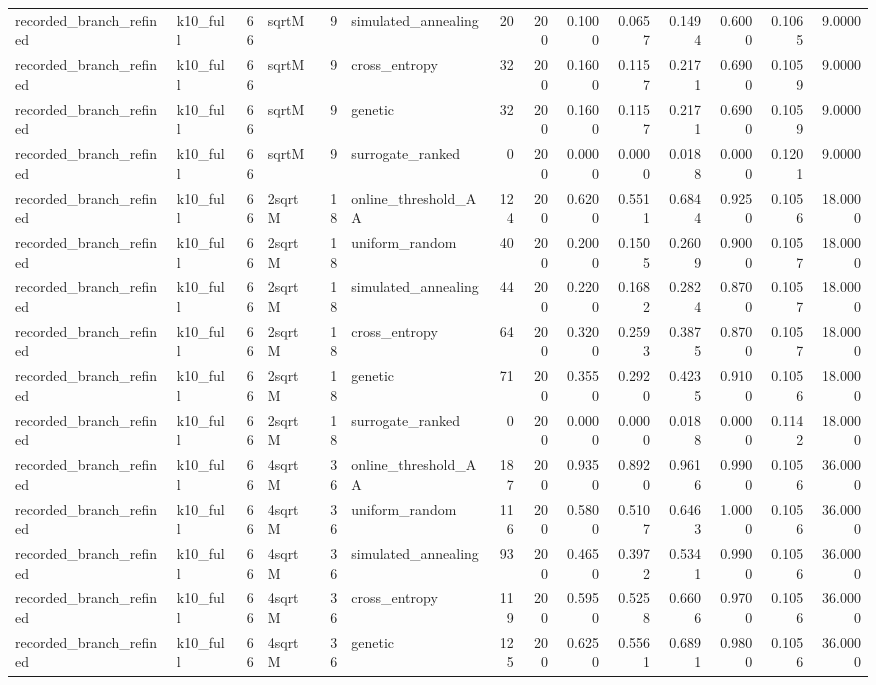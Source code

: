 \begin{tabular}{llrlrlrrrrrrrr}
recorded\_branch\_refined & k10\_full & 66 & sqrtM & 9 & simulated\_annealing & 20 & 200 & 0.1000 & 0.0657 & 0.1494 & 0.6000 & 0.1065 & 9.0000 \\
recorded\_branch\_refined & k10\_full & 66 & sqrtM & 9 & cross\_entropy & 32 & 200 & 0.1600 & 0.1157 & 0.2171 & 0.6900 & 0.1059 & 9.0000 \\
recorded\_branch\_refined & k10\_full & 66 & sqrtM & 9 & genetic & 32 & 200 & 0.1600 & 0.1157 & 0.2171 & 0.6900 & 0.1059 & 9.0000 \\
recorded\_branch\_refined & k10\_full & 66 & sqrtM & 9 & surrogate\_ranked & 0 & 200 & 0.0000 & 0.0000 & 0.0188 & 0.0000 & 0.1201 & 9.0000 \\
recorded\_branch\_refined & k10\_full & 66 & 2sqrtM & 18 & online\_threshold\_AA & 124 & 200 & 0.6200 & 0.5511 & 0.6844 & 0.9250 & 0.1056 & 18.0000 \\
recorded\_branch\_refined & k10\_full & 66 & 2sqrtM & 18 & uniform\_random & 40 & 200 & 0.2000 & 0.1505 & 0.2609 & 0.9000 & 0.1057 & 18.0000 \\
recorded\_branch\_refined & k10\_full & 66 & 2sqrtM & 18 & simulated\_annealing & 44 & 200 & 0.2200 & 0.1682 & 0.2824 & 0.8700 & 0.1057 & 18.0000 \\
recorded\_branch\_refined & k10\_full & 66 & 2sqrtM & 18 & cross\_entropy & 64 & 200 & 0.3200 & 0.2593 & 0.3875 & 0.8700 & 0.1057 & 18.0000 \\
recorded\_branch\_refined & k10\_full & 66 & 2sqrtM & 18 & genetic & 71 & 200 & 0.3550 & 0.2920 & 0.4235 & 0.9100 & 0.1056 & 18.0000 \\
recorded\_branch\_refined & k10\_full & 66 & 2sqrtM & 18 & surrogate\_ranked & 0 & 200 & 0.0000 & 0.0000 & 0.0188 & 0.0000 & 0.1142 & 18.0000 \\
recorded\_branch\_refined & k10\_full & 66 & 4sqrtM & 36 & online\_threshold\_AA & 187 & 200 & 0.9350 & 0.8920 & 0.9616 & 0.9900 & 0.1056 & 36.0000 \\
recorded\_branch\_refined & k10\_full & 66 & 4sqrtM & 36 & uniform\_random & 116 & 200 & 0.5800 & 0.5107 & 0.6463 & 1.0000 & 0.1056 & 36.0000 \\
recorded\_branch\_refined & k10\_full & 66 & 4sqrtM & 36 & simulated\_annealing & 93 & 200 & 0.4650 & 0.3972 & 0.5341 & 0.9900 & 0.1056 & 36.0000 \\
recorded\_branch\_refined & k10\_full & 66 & 4sqrtM & 36 & cross\_entropy & 119 & 200 & 0.5950 & 0.5258 & 0.6606 & 0.9700 & 0.1056 & 36.0000 \\
recorded\_branch\_refined & k10\_full & 66 & 4sqrtM & 36 & genetic & 125 & 200 & 0.6250 & 0.5561 & 0.6891 & 0.9800 & 0.1056 & 36.0000 \\

\end{tabular}
